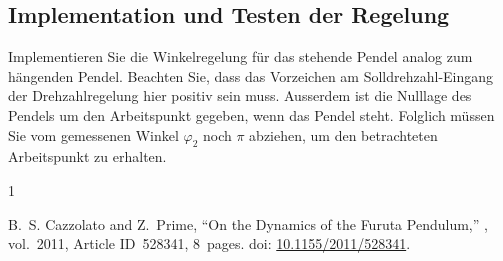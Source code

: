 \documentclass[a4paper,11pt]{scrartcl}
\begin{document}
\newpage
\subsection*{Implementation und Testen der Regelung}

Implementieren Sie die Winkelregelung für das stehende Pendel analog zum hängenden Pendel. Beachten Sie, dass das Vorzeichen am Solldrehzahl-Eingang der Drehzahlregelung hier positiv sein muss. Ausserdem ist die Nulllage des Pendels um den Arbeitspunkt gegeben, wenn das Pendel steht. Folglich müssen Sie vom gemessenen Winkel $\varphi_2$ noch $\pi$ abziehen, um den betrachteten Arbeitspunkt zu erhalten.

\begin{thebibliography}{1}

    B.~S. Cazzolato and Z.~Prime,
    \newblock ``On the Dynamics of the Furuta Pendulum,''
    , vol.~2011, Article ID~528341, 8~pages.
    \newblock doi: \href{https://doi.org/10.1155/2011/528341}{10.1155/2011/528341}.

\end{thebibliography}
\end{document}
